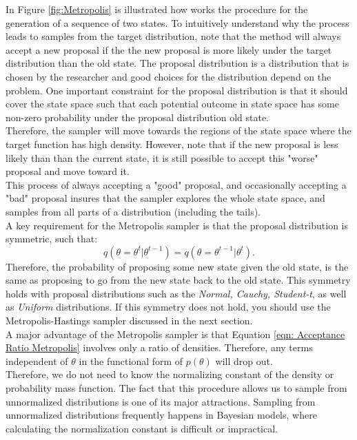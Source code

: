 In Figure \ref{fig:Metropolis}  is illustrated how works the procedure for the generation of a sequence of two states. To intuitively understand why the process leads to samples from the target distribution, note that the method will always accept a new proposal if the the new proposal is more likely under the target distribution than the old state.
The proposal distribution is a distribution that is chosen by the researcher and good choices for the distribution depend on the problem. One important constraint for the proposal distribution is that it should cover the state space such that each potential outcome in state space has some non-zero probability under the proposal distribution 
old state. \\
Therefore, the sampler will move towards the regions of the state space where the target function has high density. However, note that if the new proposal is less likely than
than the current state, it is still possible to accept this "worse" proposal and move toward it. \\ This process of always accepting a "good" proposal, and occasionally accepting a "bad" proposal insures that the sampler explores the whole state space, and samples from all parts of a distribution (including the tails).\\
A key requirement for the Metropolis sampler is that the proposal distribution is symmetric, such that:
$$
q(\theta = \theta^t|\theta^{t-1} ) = q(\theta = \theta^{t-1} |\theta^t). 
$$
Therefore, the probability of proposing some new state given the old state, is the same as proposing to go from the new state back to the old state. This symmetry holds with proposal distributions such as the \textit{Normal, Cauchy, Student-t}, as well as \textit{Uniform} distributions. If this symmetry does not hold, you should use the Metropolis-Hastings sampler discussed in the next section.\\
A major advantage of the Metropolis sampler is that Equation \ref{eqn: Acceptance Ratio Metropolis} involves only a ratio of densities. Therefore, any terms independent of $\theta$ in the functional form of $p(\theta)$ will drop out.\\
Therefore, we do not need to know the normalizing constant of the density or probability mass function. The fact that this procedure allows us to sample from unnormalized distributions is one of its major attractions. Sampling from unnormalized distributions frequently happens in Bayesian models, where calculating the normalization constant is difficult or impractical.
